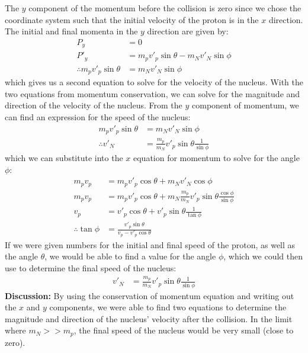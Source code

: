 \begin{example}
The $y$ component of the momentum before the collision is zero since we chose the coordinate system such that the initial velocity of the proton is in the $x$ direction. The initial and final momenta in the $y$ direction are given by:
\begin{align*}
P_y &= 0\\
P'_y &= m_p v'_p\sin\theta - m_N v'_N\sin\phi\\
\therefore m_p v'_p\sin\theta &= m_N v'_N\sin\phi
\end{align*}
which gives us a second equation to solve for the velocity of the nucleus. With the two equations from momentum conservation, we can solve for the magnitude and direction of the velocity of the nucleus. From the $y$ component of momentum, we can find an expression for the speed of the nucleus:
\begin{align*}
m_p v'_p\sin\theta &= m_N v'_N\sin\phi\\
\therefore v'_N &= \frac{m_p}{m_N}v'_p\sin\theta \frac{1}{\sin\phi}
\end{align*}
which we can substitute into the $x$ equation for momentum to solve for the angle $\phi$:
\begin{align*}
m_p v_p &= m_p v'_p\cos\theta + m_N v'_N\cos\phi\\
m_p v_p &= m_p v'_p\cos\theta + m_N\frac{m_p}{m_N}v'_p\sin\theta \frac{\cos\phi}{\sin\phi} \\
v_p &= v'_p\cos\theta + v'_p\sin\theta \frac{1}{\tan\phi}\\
\therefore \tan\phi &=  \frac{v'_p\sin\theta}{v_p-v'_p\cos\theta}
\end{align*}
If we were given numbers for the initial and final speed of the proton, as well as the angle $\theta$, we would be able to find a value for the angle $\phi$, which we could then use to determine the final speed of the nucleus:
\begin{align*}
 v'_N &= \frac{m_p}{m_N}v'_p\sin\theta \frac{1}{\sin\phi}
\end{align*}
\textbf{Discussion:} By using the conservation of momentum equation and writing out the $x$ and $y$ components, we were able to find two equations to determine the magnitude and direction of the nucleus' velocity after the collision. In the limit where $m_N >> m_p$, the final speed of the nucleus would be very small (close to zero). 
\end{example}

